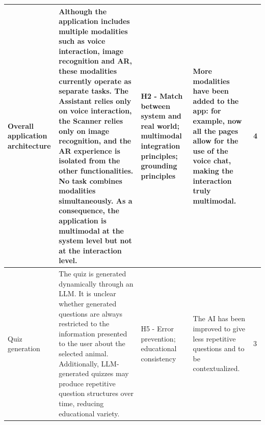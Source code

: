 \documentclass{article}
\begin{document}
\begin{longtable}{L{0.10\textwidth} L{0.28\textwidth} L{0.20\textwidth} L{0.23\textwidth} C{0.05\textwidth}}
Overall application architecture & Although the application includes multiple modalities such as voice interaction, image recognition and AR, these modalities currently operate as separate tasks. The Assistant relies only on voice interaction, the Scanner relies only on image recognition, and the AR experience is isolated from the other functionalities. No task combines modalities simultaneously. As a consequence, the application is multimodal at the system level but not at the interaction level. & H2 - Match between system and real world; multimodal integration principles; grounding principles & More modalities have been added to the app: for example, now all the pages allow for the use of the voice chat, making the interaction truly multimodal. & 4 \\
\midrule

Quiz generation & The quiz is generated dynamically through an LLM. It is unclear whether generated questions are always restricted to the information presented to the user about the selected animal. Additionally, LLM-generated quizzes may produce repetitive question structures over time, reducing educational variety. & H5 - Error prevention; educational consistency & The AI has been improved to give less repetitive questions and to be contextualized. & 3 \\
\end{longtable}
\clearpage
\end{document}

